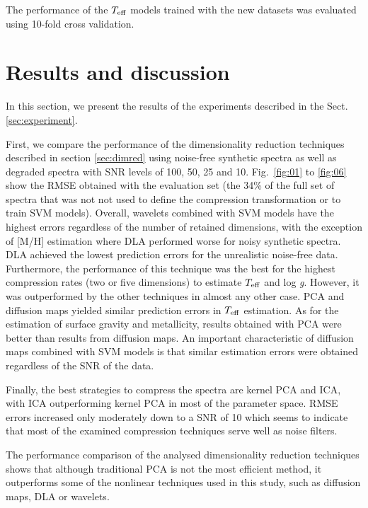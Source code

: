 \documentclass[a4paper,fleqn,usenatbib]{mnras}
\begin{document}
The performance of the $T_{\rm eff}$ models trained with the new 
datasets was evaluated using 10-fold cross validation.

\section{Results and discussion}
\label{sec:results}
In this section, we present the results of the experiments 
  described in the Sect. \ref{sec:experiment}.

First, we compare the performance of the dimensionality reduction
techniques described in section \ref{sec:dimred} using noise-free
synthetic spectra as well as degraded spectra with SNR levels of 100,
50, 25 and 10.  Fig.~\ref{fig:01} to \ref{fig:06} show the
RMSE obtained with the evaluation set (the 34\% of the full set of
spectra that was not not used to define the compression transformation
or to train SVM models). Overall, wavelets combined with SVM
models have the highest errors regardless of the number of retained
dimensions, with the exception of [M/H] estimation where DLA performed 
worse for noisy synthetic spectra. DLA achieved the lowest prediction 
errors for the unrealistic noise-free data. Furthermore, the performance 
of this technique was the best for the highest compression rates 
(two or five dimensions) to estimate $T_{\rm eff}$ and 
log \textit{g}. However, it was outperformed by the other techniques 
in almost any other case. PCA and diffusion maps yielded similar 
prediction errors in $T_{\rm eff}$ estimation. As for the estimation 
of surface gravity and metallicity, results obtained with PCA 
were better than results from diffusion maps. An important 
characteristic of diffusion maps combined with SVM models is that 
similar estimation errors were obtained regardless of the SNR of 
the data.

Finally, the best strategies to compress the spectra are kernel PCA 
and ICA, with ICA outperforming kernel PCA in most of the parameter
space. RMSE errors increased only moderately down to a SNR of 10
which seems to indicate that most of the examined compression
techniques serve well as noise filters.

The performance comparison of the analysed dimensionality reduction
techniques shows that although traditional PCA is not the most
efficient method, it outperforms some of the nonlinear techniques used
in this study, such as diffusion maps, DLA or wavelets.
\end{document}
